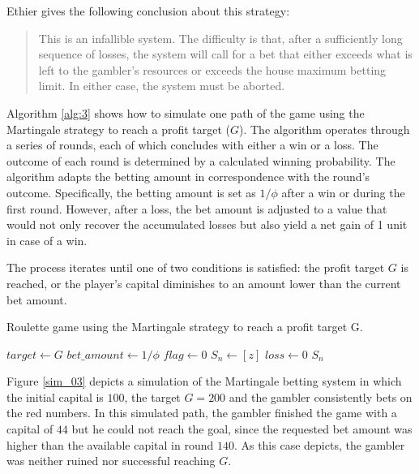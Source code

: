 \documentclass[11pt,twoside]{article}
\numberwithin{Theorem}{section}
\numberwithin{Definition}{section}
\numberwithin{Lemma}{section}
\numberwithin{Algorithm}{section}
\numberwithin{equation}{section}
\begin{document}
Ethier \cite[P.99]{chances} gives the following conclusion about this strategy:
\begin{quote} 
{\selectfont
This is an infallible system. The difficulty is that, after a sufficiently long sequence of losses, the system will call for a bet that either exceeds what is left to the gambler's resources or exceeds the house maximum betting limit. In either case, the system must be aborted.}
\end{quote}


Algorithm \ref{alg:3} shows how to simulate one path of the game using the Martingale strategy to reach a profit target ($G$). The algorithm operates through a series of rounds, each of which concludes with either a win or a loss. The outcome of each round is determined by a calculated winning probability. The algorithm adapts the betting amount in correspondence with the round's outcome. Specifically, the betting amount is set as $1/ \phi$ after a win or during the first round. However, after a loss, the bet amount is adjusted to a value that would not only recover the accumulated losses but also yield a net gain of 1 unit in case of a win.

The process iterates until one of two conditions is satisfied: the profit target $G$ is reached, or the player's capital diminishes to an amount lower than the current bet amount. 
\clearpage

\begin{algorithm}
\caption{Roulette game using the Martingale strategy to reach a profit target G.}\label{alg:3}
\SetAlgoLined
{}

$target \gets G$\;
$bet\_amount \gets 1/ \phi$\;
$flag \gets 0$\;
$S_{n} \gets [z]$\;
$loss \gets 0$\;
\Return $S_{n}$\;
\end{algorithm}

Figure \ref{sim_03} depicts a simulation of the Martingale betting system in which the initial capital is $100$, the target $G = 200$ and the gambler consistently bets on the red numbers. In this simulated path, the gambler finished the game with a capital of $44$ but he could not reach the goal, since the requested bet amount was higher than the available capital in round $140$. As this case depicts, the gambler was neither ruined nor successful reaching $G$.
\end{document}

